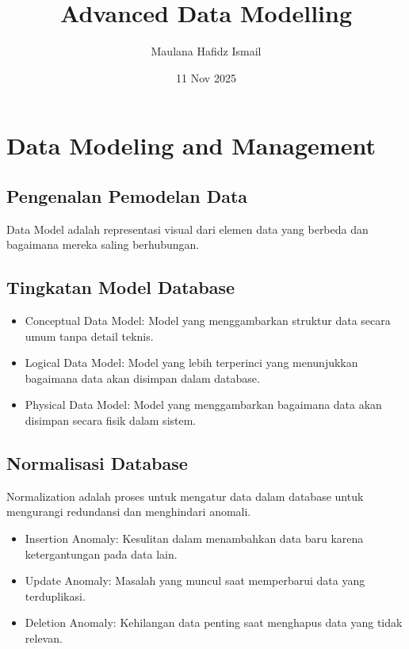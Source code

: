 \documentclass{article}
\title{Advanced Data Modelling}
\date{11 Nov 2025}
\author{Maulana Hafidz Ismail}
\begin{document}
\maketitle
\newpage

\tableofcontents
\newpage
{}

\section{Data Modeling and Management}
\subsection{Pengenalan Pemodelan Data}
Data Model adalah representasi visual dari elemen data yang berbeda dan bagaimana mereka saling berhubungan.

\subsection{Tingkatan Model Database}
\begin{itemize}
    \item Conceptual Data Model: Model yang menggambarkan struktur data secara umum tanpa detail teknis.
    \item Logical Data Model: Model yang lebih terperinci yang menunjukkan bagaimana data akan disimpan dalam database.
    \item Physical Data Model: Model yang menggambarkan bagaimana data akan disimpan secara fisik dalam sistem.
\end{itemize}

\subsection{Normalisasi Database}
Normalization adalah proses untuk mengatur data dalam database untuk mengurangi redundansi dan menghindari anomali.
\begin{itemize}
    \item Insertion Anomaly: Kesulitan dalam menambahkan data baru karena ketergantungan pada data lain.
    \item Update Anomaly: Masalah yang muncul saat memperbarui data yang terduplikasi.
    \item Deletion Anomaly: Kehilangan data penting saat menghapus data yang tidak relevan.
\end{itemize}
\end{document}
